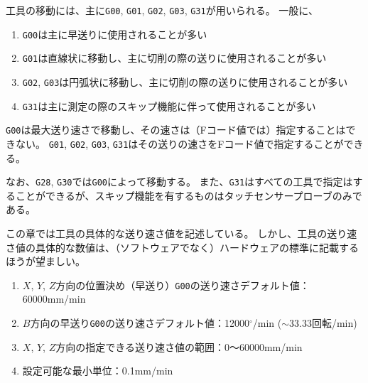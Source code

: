 

工具の移動には、主に\verb|G00|, \verb|G01|, \verb|G02|, \verb|G03|, \verb|G31|が用いられる。
一般に、
\begin{enumerate}
\item \verb|G00|は主に早送りに使用されることが多い
\item \verb|G01|は直線状に移動し、主に切削の際の送りに使用されることが多い
\item \verb|G02|, \verb|G03|は円弧状に移動し、主に切削の際の送りに使用されることが多い
\item \verb|G31|は主に測定の際のスキップ機能に伴って使用されることが多い
\end{enumerate}
\verb|G00|は最大送り速さで移動し、その速さは（Fコード値では）指定することはできない。
\verb|G01|, \verb|G02|, \verb|G03|, \verb|G31|はその送りの速さをFコード値で指定することができる。

なお、\verb|G28|, \verb|G30|では\verb|G00|によって移動する。
また、\verb|G31|はすべての工具で指定はすることができるが、スキップ機能を有するものはタッチセンサープローブのみである。
\begin{marker}
この章では工具の具体的な送り速さ値を記述している。
しかし、工具の送り速さ値の具体的な数値は、（ソフトウェアでなく）ハードウェアの標準に記載するほうが望ましい。
\end{marker}



\begin{enumerate}
\item $X$, $Y$, $Z$方向の位置決め（早送り）\verb|G00|の送り速さデフォルト値：60000mm/min
\item $B$方向の早送り\verb|G00|の送り速さデフォルト値：12000$^\circ$/min ($\sim 33.33$回転/min)
\item $X$, $Y$, $Z$方向の指定できる送り速さ値の範囲：0～60000mm/min
\item 設定可能な最小単位：0.1mm/min
\end{enumerate}



